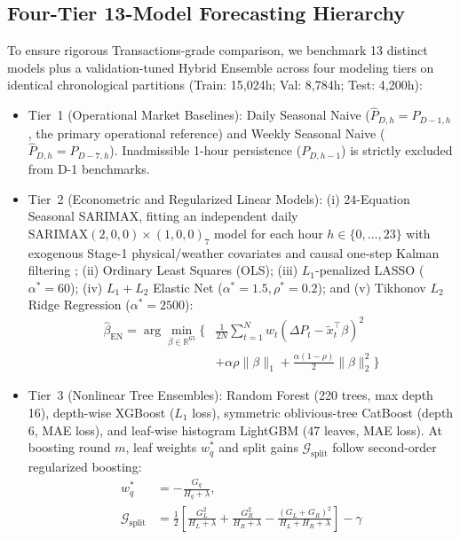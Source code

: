 \documentclass[journal,10pt,twocolumn]{IEEEtran}
\begin{document}
\subsection{Four-Tier 13-Model Forecasting Hierarchy}
To ensure rigorous Transactions-grade comparison, we benchmark 13 distinct models plus a validation-tuned Hybrid Ensemble across four modeling tiers on identical chronological partitions (Train: 15,024h; Val: 8,784h; Test: 4,200h):
\begin{itemize}
    \item Tier~1 (Operational Market Baselines): Daily Seasonal Naive ($\hat{P}_{D,h} = P_{D-1,h}$, the primary operational reference) and Weekly Seasonal Naive ($\hat{P}_{D,h} = P_{D-7,h}$). Inadmissible 1-hour persistence ($P_{D,h-1}$) is strictly excluded from D-1 benchmarks.
    \item Tier~2 (Econometric and Regularized Linear Models): (i) 24-Equation Seasonal SARIMAX, fitting an independent daily $\text{SARIMAX}(2,0,0)\times(1,0,0)_7$ model for each hour $h \in \{0,\dots,23\}$ with exogenous Stage-1 physical/weather covariates and causal one-step Kalman filtering \cite{ziel2018day}; (ii) Ordinary Least Squares (OLS); (iii) $L_1$-penalized LASSO ($\alpha^* = 60$); (iv) $L_1+L_2$ Elastic Net ($\alpha^* = 1.5, \rho^* = 0.2$); and (v) Tikhonov $L_2$ Ridge Regression ($\alpha^* = 2500$):
    \begin{equation}
    \begin{aligned}
    \hat{\beta}_{\text{EN}} = \arg\min_{\beta \in \mathbb{R}^{65}} \Big\{ & \frac{1}{2N}\sum_{t=1}^{N} w_t (\Delta P_t - \tilde{x}_t^\top \beta)^2 \\
    & + \alpha \rho \|\beta\|_1 + \frac{\alpha(1-\rho)}{2}\|\beta\|_2^2 \Big\}
    \end{aligned}
    \label{eq:elastic_net}
    \end{equation}
    \item Tier~3 (Nonlinear Tree Ensembles): Random Forest (220 trees, max depth 16), depth-wise XGBoost \cite{chen2016xgboost} ($L_1$ loss), symmetric oblivious-tree CatBoost \cite{prokhorenkova2018catboost} (depth 6, MAE loss), and leaf-wise histogram LightGBM \cite{ke2017lightgbm} (47 leaves, MAE loss). At boosting round $m$, leaf weights $w_q^*$ and split gains $\mathcal{G}_{\text{split}}$ follow second-order regularized boosting:
    \begin{equation}
    \begin{aligned}
    w_q^* &= -\frac{G_q}{H_q + \lambda}, \\
    \mathcal{G}_{\text{split}} &= \frac{1}{2}\left[\frac{G_L^2}{H_L+\lambda} + \frac{G_R^2}{H_R+\lambda} - \frac{(G_L+G_R)^2}{H_L+H_R+\lambda}\right] - \gamma

\end{aligned}
\end{equation}
\end{itemize}
\end{document}
